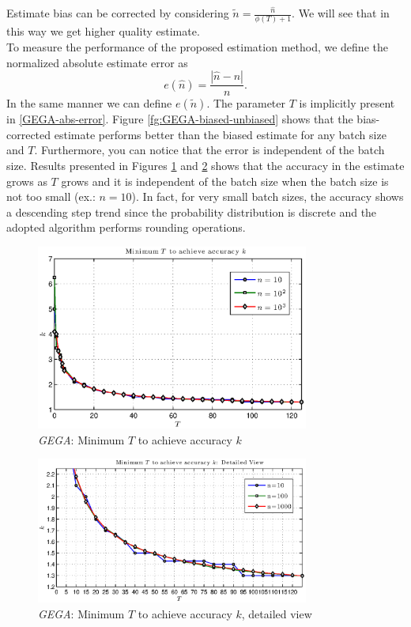 \documentclass[11pt,a4paper,twoside,openright]{book}
\begin{document}
Estimate bias can be corrected by considering $\tilde{n}={\displaystyle \frac{\hat{n}}{\phi(T)+1}}$. We will see that in this way we get higher quality estimate.\\
To measure the performance of the proposed estimation method, we define the normalized absolute estimate error as
\begin{equation}
e(\hat{n})=\frac{|\hat{n}-n|}{n}.
\label{GEGA-abs-error}
\end{equation}
In the same manner we can define $e(\tilde{n})$. The parameter $T$ is implicitly present in \eqref{GEGA-abs-error}.
Figure \ref{fg:GEGA-biased-unbiased} shows that the bias-corrected estimate performs better than the biased estimate for any batch size and $T$. Furthermore, you can notice that the error is independent of the batch size.  Results presented in Figures  \ref{fg:GEGA-min-T-for-k} and  \ref{fg:GEGA-min-T-for-k-detail} shows that the accuracy in the estimate grows as $T$ grows and it is independent of the batch size when the batch size is not too small (ex.: $n=10$). In fact, for very small batch sizes, the accuracy shows a descending step trend since the  probability distribution is discrete and the adopted algorithm performs rounding operations. 
\begin{figure}[thbp]
\centering
    \includegraphics[width=0.8\textwidth,height=0.3\textheight]{matlab/GEGA/GEGA-min-T-for-k}%
 \caption{\emph{GEGA}: Minimum $T$ to achieve accuracy $k$}
 \label{fg:GEGA-min-T-for-k}
\end{figure}

\begin{figure}[thbp]
\centering
    \includegraphics[width=0.8\textwidth,height=0.3\textheight]{matlab/GEGA/GEGA-min-T-for-k-detail}%
 \caption{\emph{GEGA}: Minimum $T$ to achieve accuracy $k$, detailed view}
 \label{fg:GEGA-min-T-for-k-detail}
\end{figure}
\end{document}
